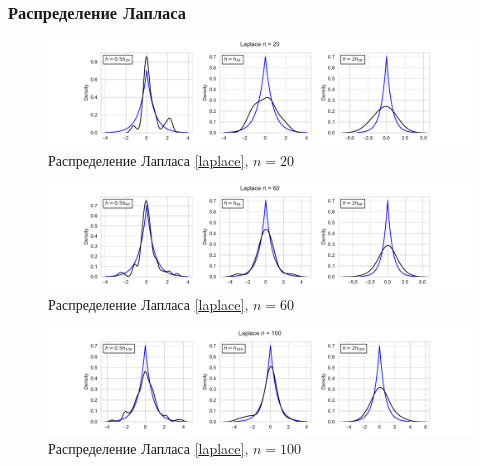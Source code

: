 \documentclass[a4paper]{article}
\begin{document}
\subsubsection{Распределение Лапласа}
\begin{figure}[H]
    \centering
    \includegraphics[width = 16 cm]{resources/laplaceKde20.pdf}
    \caption{Распределение Лапласа \eqref{laplace}, $n = 20$}
    \label{fig:laplaceKDE20}
\end{figure}
\begin{figure}[H]
    \centering
    \includegraphics[width = 16 cm]{resources/laplaceKde60.pdf}
    \caption{Распределение Лапласа \eqref{laplace}, $n = 60$}
    \label{fig:laplaceKDE60}
\end{figure}
\begin{figure}[H]
    \centering
    \includegraphics[width = 16 cm]{resources/laplaceKde100.pdf}
    \caption{Распределение Лапласа \eqref{laplace}, $n = 100$}
    \label{fig:laplaceKDE100}
\end{figure}
\end{document}
